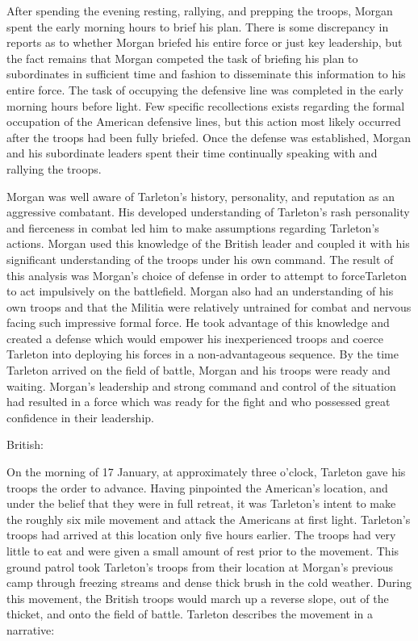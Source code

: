 After spending the evening resting, rallying, and prepping the troops, Morgan
spent the early morning hours to brief his plan. There is some discrepancy in
reports as to whether Morgan briefed his entire force or just key leadership,
but the fact remains that Morgan competed the task of briefing his plan to
subordinates in sufficient time and fashion to disseminate this information to
his entire force. The task of occupying the defensive line was completed in the
early morning hours before light. Few specific recollections exists regarding
the formal occupation of the American defensive lines, but this action most
likely occurred after the troops had been fully briefed. Once the defense was
established, Morgan and his subordinate leaders spent their time continually
speaking with and rallying the troops.

Morgan was well aware of Tarleton's history, personality, and reputation as an
aggressive combatant. His developed understanding of Tarleton's rash
personality and fierceness in combat led him to make assumptions regarding
Tarleton's actions. Morgan used this knowledge of the British leader and
coupled it with his significant understanding of the troops under his own
command. The result of this analysis was Morgan's choice of defense in order to
attempt to forceTarleton to act impulsively on the battlefield. Morgan also had
an understanding of his own troops and that the Militia were relatively
untrained for combat and nervous facing such impressive formal force. He took
advantage of this knowledge and created a defense which would empower his
inexperienced troops and coerce Tarleton into deploying his forces in a
non-advantageous sequence. By the time Tarleton arrived on the field of battle,
Morgan and his troops were ready and waiting. Morgan's leadership and strong
command and control of the situation had resulted in a force which was ready
for the fight and who possessed great confidence in their leadership.

British:

On the morning of 17 January, at approximately three o'clock, Tarleton gave his
troops the order to advance. Having pinpointed the American's location, and
under the belief that they were in full retreat, it was Tarleton's intent to
make the roughly six mile movement and attack the Americans at first light.
Tarleton's troops had arrived at this location only five hours earlier. The
troops had very little to eat and were given a small amount of rest prior to
the movement. This ground patrol took Tarleton's troops from their location at
Morgan's previous camp through freezing streams and dense thick brush in the
cold weather. During this movement, the British troops would march up a reverse
slope, out of the thicket, and onto the field of battle. Tarleton describes the
movement in a narrative:

